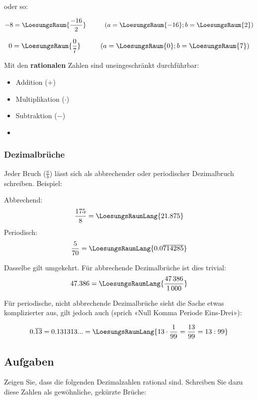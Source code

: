 oder so:

$$-8 = \LoesungsRaum{\frac{-16}{2}} \hspace{1cm} (a=\LoesungsRaum{-16}; b=\LoesungsRaum{2})$$

$$0 = \LoesungsRaum{\frac{0}{7}} \hspace{1cm} (a=\LoesungsRaum{0}; b=\LoesungsRaum{7})$$


Mit den \textbf{rationalen} Zahlen sind uneingeschränkt durchführbar:
\begin{itemize}
\item Addition ($+$)
\item Multiplikation ($\cdot$)
\item Subtraktion ($-$)
\item {}
\end{itemize}

\newpage


\subsubsection{Dezimalbrüche}
Jeder Bruch ($\frac{a}{b}$) lässt sich als
abbrechender oder periodischer Dezimalbruch schreiben. Beispiel:

Abbrechend:
$$\frac{175}{8} = \LoesungsRaumLang{21.875}$$
Periodisch:
$$\frac{5}{70} = \LoesungsRaumLang{0.0\overline{714285}}$$

Dasselbe gilt umgekehrt. Für abbrechende Dezimalbrüche ist dies
trivial:
$$47.386 = \LoesungsRaumLang{\frac{47\,386}{1\,000}}$$

Für periodische, nicht abbrechende
Dezimalbrüche sieht die Sache etwas komplizierter aus,
gilt jedoch auch (sprich «Null Komma Periode Eins-Drei»):

$$0.\overline{13} = 0.131313... = \LoesungsRaumLang{13\cdot{}\frac1{99}=\frac{13}{99} = 13 : 99}$$



  \subsection*{Aufgaben}
  Zeigen Sie, dass die folgenden Dezimalzahlen rational sind. Schreiben Sie dazu diese Zahlen als gewöhnliche, gekürzte Brüche:

